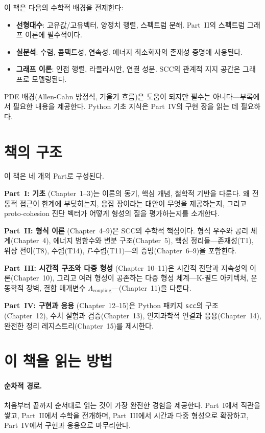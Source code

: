 이 책은 다음의 수학적 배경을 전제한다:
\begin{itemize}
    \item \textbf{선형대수}: 고유값/고유벡터, 양정치 행렬, 스펙트럼 분해. Part~II의 스펙트럼 그래프 이론에 필수적이다.
    \item \textbf{실분석}: 수렴, 콤팩트성, 연속성. 에너지 최소화자의 존재성 증명에 사용된다.
    \item \textbf{그래프 이론}: 인접 행렬, 라플라시안, 연결 성분. SCC의 관계적 지지 공간은 그래프로 모델링된다.
\end{itemize}

PDE 배경(Allen-Cahn 방정식, 기울기 흐름)은 도움이 되지만 필수는 아니다---부록에서 필요한 내용을 제공한다. Python 기초 지식은 Part~IV의 구현 장을 읽는 데 필요하다.


\section*{책의 구조}

이 책은 네 개의 Part로 구성된다.

\textbf{Part~I: 기초} (Chapter~1--3)는 이론의 동기, 핵심 개념, 철학적 기반을 다룬다. 왜 전통적 접근이 한계에 부딪히는지, 응집 장이라는 대안이 무엇을 제공하는지, 그리고 proto-cohesion 진단 벡터가 어떻게 형성의 질을 평가하는지를 소개한다.

\textbf{Part~II: 형식 이론} (Chapter~4--9)은 SCC의 수학적 핵심이다. 형식 우주와 공리 체계(Chapter~4), 에너지 범함수와 변분 구조(Chapter~5), 핵심 정리들---존재성(T1), 위상 전이(T8), 수렴(T14), $\Gamma$-수렴(T11)---의 증명(Chapter~6--9)을 포함한다.

\textbf{Part~III: 시간적 구조와 다중 형성} (Chapter~10--11)은 시간적 전달과 지속성의 이론(Chapter~10), 그리고 여러 형성이 공존하는 다중 형성 체계---K-필드 아키텍처, 운동학적 장벽, 결합 매개변수 $\Lambda_{\mathrm{coupling}}$---(Chapter~11)을 다룬다.

\textbf{Part~IV: 구현과 응용} (Chapter~12--15)은 Python 패키지 \texttt{scc}의 구조(Chapter~12), 수치 실험과 검증(Chapter~13), 인지과학적 연결과 응용(Chapter~14), 완전한 정리 레지스트리(Chapter~15)를 제시한다.


\section*{이 책을 읽는 방법}

\paragraph{순차적 경로.}
처음부터 끝까지 순서대로 읽는 것이 가장 완전한 경험을 제공한다. Part~I에서 직관을 쌓고, Part~II에서 수학을 전개하며, Part~III에서 시간과 다중 형성으로 확장하고, Part~IV에서 구현과 응용으로 마무리한다.

